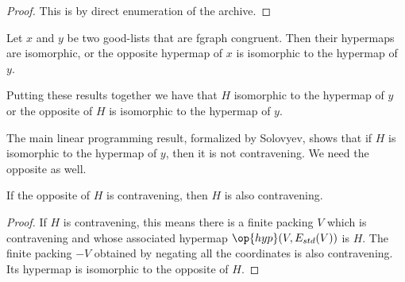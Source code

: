 
\begin{proof} This is by direct enumeration of the archive.
\end{proof}

\begin{lemma}
Let $x$ and $y$ be two good-lists that are fgraph congruent.
Then their hypermaps are isomorphic, or the opposite hypermap of $x$
is isomorphic to the hypermap of $y$.
\end{lemma} 

Putting these results together we have that $H$ isomorphic to the
hypermap of $y$ or the opposite of $H$ is isomorphic to the hypermap
of $y$.

The main linear programming result, formalized by Solovyev, shows
that if $H$ is isomorphic to the hypermap of $y$, then it is not
contravening.  We need the opposite as well.

\begin{lemma}
 If the opposite of $H$ is contravening, then  $H$
is also contravening.  
\end{lemma} 

\begin{proof}
  If $H$ is contravening, this means there is a finite packing $V$
  which is contravening and whose associated hypermap
  $\op{hyp}(V,E_{std}(V))$ is $H$.  The finite packing $-V$ obtained
  by negating all the coordinates is also contravening.  Its hypermap
  is isomorphic to the opposite of $H$.
\end{proof}















